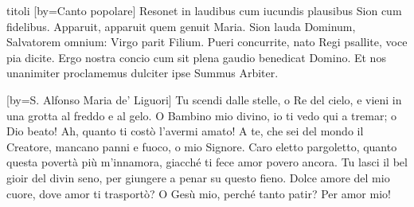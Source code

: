 \begin{songs}{titoli}
[by={Canto popolare}]
\beginverse
Resonet in laudibus cum iucundis plausibus Sion cum fidelibus.
\endverse
\beginchorus
Apparuit, apparuit quem genuit Maria. 
\endchorus
\beginverse
Sion lauda Dominum, Salvatorem omnium: Virgo parit Filium.
\endverse
\beginverse
Pueri concurrite, nato Regi psallite, voce pia dicite.
\endverse
\beginverse
Ergo nostra concio cum sit plena gaudio benedicat Domino.
\endverse
\beginverse
Et nos unanimiter proclamemus dulciter ipse Summus Arbiter.
\endverse
\endsong

[by={S. Alfonso Maria de' Liguori}]
\beginverse
Tu scendi dalle stelle, o Re del cielo,
e vieni in una grotta al freddo e al gelo. 
O Bambino mio divino,
io ti vedo qui a tremar;
o Dio beato!
Ah, quanto ti costò l'avermi amato! 
\endverse
\beginverse
A te, che sei del mondo il Creatore,
mancano panni e fuoco, o mio Signore. 
Caro eletto pargoletto,
quanto questa povertà
più m'innamora,
giacché ti fece amor povero ancora. 
\endverse
\beginverse
Tu lasci il bel gioir del divin seno,
per giungere a penar su questo fieno. 
Dolce amore del mio cuore,
dove amor ti trasportò?
O Gesù mio,
perché tanto patir? Per amor mio! 
\endverse
\endsong

\end{songs}
